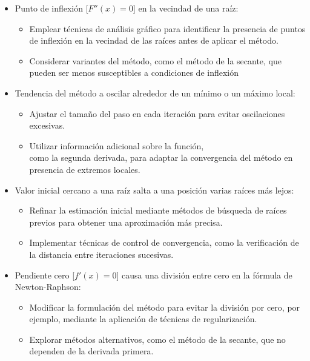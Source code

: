 \documentclass[conference]{IEEEtran}
\begin{document}
\begin{itemize}
	\item Punto de inflexión [$F''(x) = 0$] en la vecindad de una raíz:
	      \begin{itemize}
		      \item Emplear técnicas de análisis gráfico para identificar
		            la presencia de puntos de inflexión en la vecindad de las
		            raíces antes de aplicar el método.

		      \item Considerar variantes del método, como el método de la
		            secante, que pueden ser menos susceptibles a condiciones de
		            inflexión
	      \end{itemize}

	\item Tendencia del método a oscilar alrededor de un mínimo o un máximo
	      local:
	      \begin{itemize}
		      \item Ajustar el tamaño del paso en cada iteración para evitar
		            oscilaciones excesivas.

		      \item Utilizar información adicional sobre la función, \\ como
		            la segunda derivada, para adaptar la convergencia del método
		            en presencia de extremos locales.
	      \end{itemize}

	\item Valor inicial cercano a una raíz salta a una posición varias
	      raíces más lejos:
	      \begin{itemize}
		      \item Refinar la estimación inicial mediante métodos de búsqueda de
		            raíces previos para obtener una aproximación más precisa.

		      \item Implementar técnicas de control de convergencia, como la
		            verificación de la distancia entre iteraciones sucesivas.
	      \end{itemize}

	\item Pendiente cero [$f'(x) = 0$] causa una división entre cero en la
	      fórmula de Newton-Raphson:
	      \begin{itemize}
		      \item Modificar la formulación del método para evitar la división
		            por cero, por ejemplo, mediante la aplicación de técnicas de
		            regularización.
		      \item Explorar métodos alternativos, como el método de la
		            secante, que no dependen de la derivada primera.

	      \end{itemize}
\end{itemize}
\end{document}
